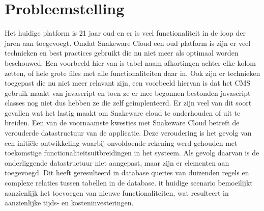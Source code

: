 \section{Probleemstelling}
Het huidige platform is 21 jaar oud en er is veel functionaliteit in de loop der jaren aan toegevoegt.
Omdat Snakeware Cloud een oud platform is zijn er veel technieken en best practices gebruikt die nu niet meer als optimaal worden beschouwed.
Een voorbeeld hier van is tabel naam afkortingen achter elke kolom zetten, of hele grote files met alle functionaliteiten daar in. 
Ook zijn er technieken toegepast die nu niet meer relavant zijn, een voorbeeld hiervan is dat het CMS gebruik maakt van javascript en toen ze er mee begonnen bestonden javascript classes nog niet dus hebben ze die zelf geimplenteerd.
Er zijn veel van dit soort gevallen wat het lastig maakt om Snakeware cloud te onderhouden of uit te breiden.
\whitespace
Een van de voornaamste kwesties met Snakeware Cloud betreft de verouderde datastructuur van de applicatie.
Deze veroudering is het gevolg van een initiële ontwikkeling waarbij onvoldoende rekening werd gehouden met toekomstige functionaliteitsuitbreidingen in het systeem.
Als gevolg daarvan is de onderliggende datastructuur niet aangepast, maar zijn er elementen aan toegevoegd.
Dit heeft geresulteerd in database queries van duizenden regels en complexe relaties tussen tabellen in de database.
it huidige scenario bemoeilijkt aanzienlijk het toevoegen van nieuwe functionaliteiten, wat resulteert in aanzienlijke tijds- en kosteninvesteringen.
